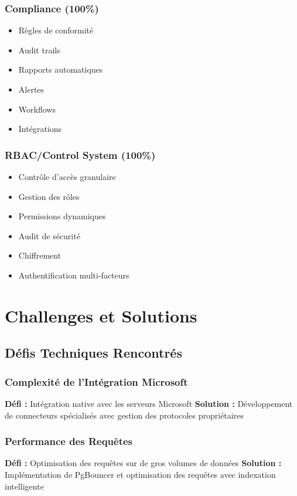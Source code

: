 \documentclass[12pt,a4paper]{article}
\begin{document}
\subsubsection{Compliance (100\%)}
\begin{itemize}
    \item Règles de conformité
    \item Audit trails
    \item Rapports automatiques
    \item Alertes
    \item Workflows
    \item Intégrations
\end{itemize}

\subsubsection{RBAC/Control System (100\%)}
\begin{itemize}
    \item Contrôle d'accès granulaire
    \item Gestion des rôles
    \item Permissions dynamiques
    \item Audit de sécurité
    \item Chiffrement
    \item Authentification multi-facteurs
\end{itemize}

\section{Challenges et Solutions}

\subsection{Défis Techniques Rencontrés}

\subsubsection{Complexité de l'Intégration Microsoft}
\textbf{Défi :} Intégration native avec les serveurs Microsoft
\textbf{Solution :} Développement de connecteurs spécialisés avec gestion des protocoles propriétaires

\subsubsection{Performance des Requêtes}
\textbf{Défi :} Optimisation des requêtes sur de gros volumes de données
\textbf{Solution :} Implémentation de PgBouncer et optimisation des requêtes avec indexation intelligente
\end{document}

